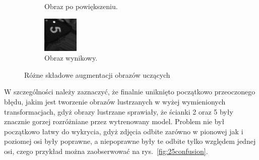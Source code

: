 \begin{figure}[h]
\begin{subfigure}[t]{0.32\linewidth}
        \caption{Obraz po powiększeniu.}
        \label{fig:5zoom}
    \end{subfigure}
    \hfill
    \begin{subfigure}[t]{0.32\linewidth}
        \centering
        \includegraphics[width=\linewidth]{chapters/04-czytanie/figures/combined_1}
        \caption{Obraz wynikowy.}
        \label{fig:5combined}
    \end{subfigure}

    \caption{Różne składowe augmentacji obrazów uczących}
    \label{fig:5augment}
\end{figure}


W szczególności należy zaznaczyć, że finalnie uniknięto początkowo przeoczonego błędu,
jakim jest tworzenie obrazów lustrzanych w wyżej wymienionych transformacjach, gdyż obrazy lustrzane
sprawiały, że ścianki 2 oraz 5 były znacznie gorzej rozróżniane przez wytrenowany model.
Problem nie był początkowo łatwy do wykrycia, gdyż zdjęcia odbite zarówno w pionowej jak i poziomej osi były poprawne,
a niepoprawne były te odbite tylko względem jednej osi, czego przykład można zaobserwować na rys.~\ref{fig:25confusion}.


